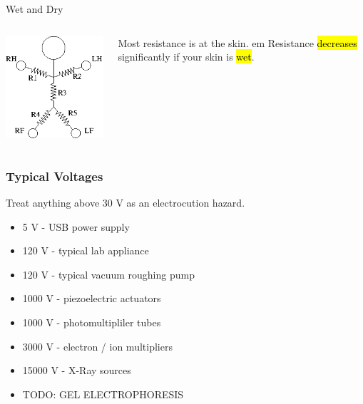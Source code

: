 \documentclass{presentation}
\begin{document}
\begin{frame}{Wet and Dry}
  \begin{columns}
    \begin{column}{0.33\textwidth}
      \includegraphics[width=\textwidth]{"./resistor-person.png"}
    \end{column}
    \begin{column}{0.67\textwidth}
      Most resistance is at the skin.
       em
      Resistance \hl{decreases} significantly if your skin is \hl{wet}.
    \end{column}
  \end{columns}
\end{frame}

\begin{frame}
  \frametitle{Typical Voltages}
  Treat anything above 30 V as an electrocution hazard.
  \begin{itemize}
    \item 5 V - USB power supply
    \item 120 V - typical lab appliance
    \item 120 V - typical vacuum roughing pump
    \item 1000 V - piezoelectric actuators
    \item 1000 V - photomultipliler tubes
    \item 3000 V - electron / ion multipliers
    \item 15000 V - X-Ray sources
    \item TODO: GEL ELECTROPHORESIS
  \end{itemize}
\end{frame}
\end{document}

